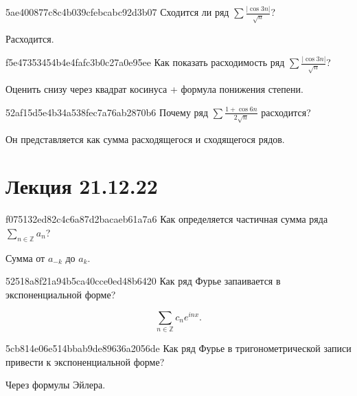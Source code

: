 \begin{note}{5ae400877c8c4b039cfebcabc92d3b07}
    Сходится ли ряд \({ \sum \frac{\left\lvert \cos 3n \right\rvert}{\sqrt{n}} }\)?

    \begin{cloze}{1}
        Расходится.
    \end{cloze}
\end{note}

\begin{note}{f5e47353454b4e4fafc3b0c27a0e95ee}
    Как показать расходимость ряд \({ \sum \frac{\left\lvert \cos 3n \right\rvert}{\sqrt{n}} }\)?

    \begin{cloze}{1}
        Оценить снизу через квадрат косинуса + формула понижения степени.
    \end{cloze}
\end{note}

\begin{note}{52af15d5e4b34a538fec7a76ab2870b6}
    Почему ряд \({ \sum \frac{1 + \cos 6n}{2 \sqrt{n}} }\) расходится?

    \begin{cloze}{1}
        Он представляется как сумма расходящегося и сходящегося рядов.
    \end{cloze}
\end{note}

\section{Лекция 21.12.22}
\begin{note}{f075132ed82c4c6a87d2bacaeb61a7a6}
    Как определяется частичная сумма ряда \({ \sum_{n \in \mathbb Z} a_n }\)?

    \begin{cloze}{1}
        Сумма от \({ a_{-k} }\) до \({ a_k }\).
    \end{cloze}
\end{note}

\begin{note}{52518a8f21a94b5ca40cce0ed48b6420}
    Как ряд Фурье запаивается в экспоненциальной форме?

    \begin{cloze}{1}
        \[
            \sum_{n \in \mathbb Z} c_n e^{i nx}.
        \]
    \end{cloze}
\end{note}

\begin{note}{5cb814e06e514bbab9de89636a2056de}
    Как ряд Фурье в тригонометрической записи привести к экспоненциальной форме?

    \begin{cloze}{1}
        Через формулы Эйлера.
    \end{cloze}
\end{note}

